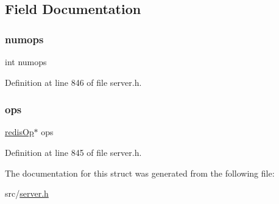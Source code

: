\subsection{Field Documentation}
\mbox{\label{structredis_op_array_aa2e11274504033ec9d5501c462f9fbaa}} 
\subsubsection{\texorpdfstring{numops}{numops}}
{\footnotesize\ttfamily int numops}



Definition at line 846 of file server.\+h.

\mbox{\label{structredis_op_array_a8a0d6869823f5a12e276fe2f7473f60f}} 
\subsubsection{\texorpdfstring{ops}{ops}}
{\footnotesize\ttfamily \hyperlink{structredis_op}{redis\+Op}$\ast$ ops}



Definition at line 845 of file server.\+h.



The documentation for this struct was generated from the following file\+:\begin{DoxyCompactItemize}
\item 
src/\hyperlink{server_8h}{server.\+h}\end{DoxyCompactItemize}
